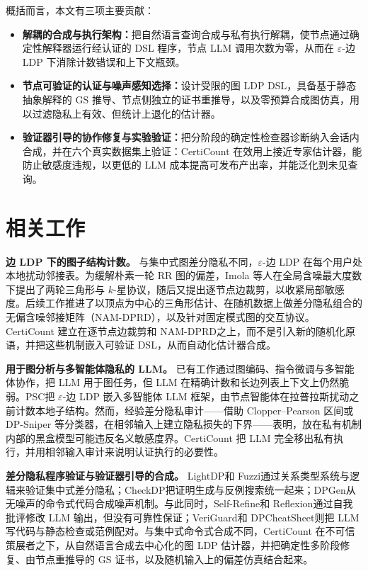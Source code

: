 \documentclass[11pt]{article}
\newlength{\zhindent}
\newcommand{\parhead}[1]{\par\noindent\hspace*{\zhindent}\textbf{#1}}
\theoremstyle{ieeeitalic}
\newcommand{\GS}{\mathrm{GS}}
\begin{document}
概括而言，本文有三项主要贡献：
\begin{itemize}
    \item \textbf{解耦的合成与执行架构：}把自然语言查询合成与私有执行解耦，使节点通过确定性解释器运行经认证的 DSL 程序，节点 LLM 调用次数为零，从而在 $\varepsilon$-边 LDP 下消除计数错误和上下文瓶颈。
    \item \textbf{节点可验证的认证与噪声感知选择：}设计受限的图 LDP DSL，具备基于静态抽象解释的 $\GS$ 推导、节点侧独立的证书重推导，以及零预算合成图仿真，用以过滤隐私上有效、但统计上退化的估计器。
    \item \textbf{验证器引导的协作修复与实验验证：}把分阶段的确定性检查器诊断纳入会话内合成，并在六个真实数据集上验证：CertiCount 在效用上接近专家估计器，能防止敏感度违规，以更低的 LLM 成本提高可发布产出率，并能泛化到未见查询。
\end{itemize}

\section{相关工作}
\label{sec:related}

\parhead{边 LDP 下的图子结构计数。}
与集中式图差分隐私\cite{dwork2014algorithmic}不同，$\varepsilon$-边 LDP 在每个用户处本地扰动邻接表。为缓解朴素一轮 RR 图的偏差，Imola 等人\cite{imola2021locally}在全局含噪最大度数下提出了两轮三角形与 $k$-星协议，随后又提出逐节点边裁剪\cite{imola2022communication}，以收紧局部敏感度。后续工作推进了以顶点为中心的三角形估计\cite{he2025robust}、在随机数据上做差分隐私组合的无偏含噪邻接矩阵（NAM-DPRD）\cite{guo2025nam}，以及针对固定模式图的交互协议\cite{chen2026power}。CertiCount 建立在逐节点边裁剪\cite{imola2022communication}和 NAM-DPRD\cite{guo2025nam}之上，而不是引入新的随机化原语，并把这些机制嵌入可验证 DSL，从而自动化估计器合成。

\parhead{用于图分析与多智能体隐私的 LLM。}
已有工作通过图编码、指令微调与多智能体协作，把 LLM 用于图任务\cite{wang2023can,chen2024graphwiz,hu2024scalable}，但 LLM 在精确计数和长边列表上下文上仍然脆弱\cite{liu2023lost}。PSC\cite{zhang2026psc}把 $\varepsilon$-边 LDP 嵌入多智能体 LLM 框架，由节点智能体在拉普拉斯扰动之前计数本地子结构。然而，经验差分隐私审计——借助 Clopper--Pearson 区间\cite{jagielski2020auditing}或 DP-Sniper 等分类器\cite{bichsel2021dpsniper}，在相邻输入上建立隐私损失的下界——表明，放在私有机制内部的黑盒模型可能违反名义敏感度界。CertiCount 把 LLM 完全移出私有执行，并用相邻输入审计\cite{jagielski2020auditing}来说明认证执行的必要性。

\parhead{差分隐私程序验证与验证器引导的合成。}
LightDP\cite{zhang2017lightdp}和 Fuzzi\cite{zhang2019fuzzi}通过关系类型系统与逻辑来验证集中式差分隐私；CheckDP\cite{wang2020checkdp}把证明生成与反例搜索统一起来；DPGen\cite{wang2021dpgen}从无噪声的命令式代码合成噪声机制。与此同时，Self-Refine\cite{madaan2023selfrefine}和 Reflexion\cite{shinn2023reflexion}通过自我批评修改 LLM 输出，但没有可靠性保证；VeriGuard\cite{miculicich2025veriguard}和 DPCheatSheet\cite{chu2025dpcheatsheet}则把 LLM 写代码与静态检查或范例配对。与集中式命令式合成不同，CertiCount 在不可信策展者之下，从自然语言合成去中心化的图 LDP 估计器，并把确定性多阶段修复、由节点重推导的 $\GS$ 证书，以及随机输入上的偏差仿真结合起来。
\end{document}

